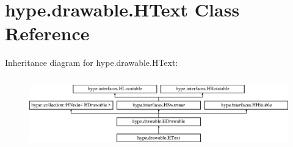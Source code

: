 \hypertarget{classhype_1_1drawable_1_1_h_text}{\section{hype.\-drawable.\-H\-Text Class Reference}
\label{classhype_1_1drawable_1_1_h_text}
}
Inheritance diagram for hype.\-drawable.\-H\-Text\-:\begin{figure}[H]
\begin{center}
\leavevmode
\includegraphics[height=3.111111cm]{classhype_1_1drawable_1_1_h_text}
\end{center}
\end{figure}
